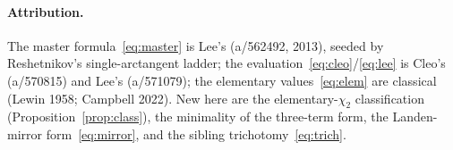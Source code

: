 \documentclass[11pt]{article}
\newcommand{\chitwo}{\chi_{2}}
\theoremstyle{plain}\newtheorem{theorem}{Theorem}\newtheorem{proposition}[theorem]{Proposition}
\theoremstyle{remark}\newtheorem{remark}[theorem]{Remark}
\begin{document}
\paragraph{Attribution.} The master formula~\eqref{eq:master} is Lee's (a/562492, 2013), seeded by
Reshetnikov's single-arctangent ladder; the evaluation~\eqref{eq:cleo}/\eqref{eq:lee} is Cleo's
(a/570815) and Lee's (a/571079); the elementary values~\eqref{eq:elem} are classical (Lewin 1958;
Campbell 2022). New here are the elementary-$\chitwo$ classification (Proposition~\ref{prop:class}), the
minimality of the three-term form, the Landen-mirror form~\eqref{eq:mirror}, and the sibling
trichotomy~\eqref{eq:trich}.
\end{document}

